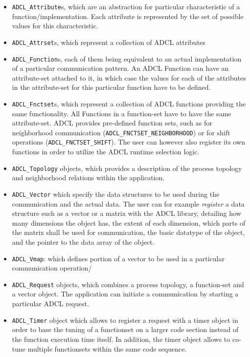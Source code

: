 \begin{itemize}

\item {\tt ADCL\_Attribute}s, which are an abstraction for particular
  characteristic of a function/implementation. Each attribute is represented
  by the set of possible values for this characteristic.

\item {\tt ADCL\_Attrset}s, which represent a collection of ADCL attributes

\item {\tt ADCL\_Function}s, each of them being equivalent to an actual
  implementation of a particular communication pattern. An ADCL Function can
  have an attribute-set attached to it, in which case the values for each of
  the attributes in the attribute-set for this particular function have to be
  defined.

\item {\tt ADCL\_Fnctset}s, which represent a collection of ADCL functions
  providing the same functionality. All Functions in a function-set have to
  have the same attribute-set. ADCL provides pre-defined function sets, such
  as for neighborhood communication ({\tt ADCL\_FNCTSET\_NEIGHBORHOOD}) or for
  shift operations ({\tt ADCL\_FNCTSET\_SHIFT}). The user can however also
  register its own functions in order to utilize the ADCL runtime selection
  logic.

\item {\tt ADCL\_Topology} objects, which provides a description of the
  process topology and neighborhood relations within the application.


\item {\tt ADCL\_Vector} which specify the data structures to be used during
  the communication and the actual data. The user can for example {\it
    register} a data structure such as a vector or a matrix with the ADCL
  library, detailing how many dimensions the object has, the extent of each
  dimension, which parts of the matrix shall be used for communication, the
  basic datatype of the object, and the pointer to the data array of the
  object.

\item {\tt ADCL\_Vmap}: which defines portion of a vector to be used in a
  particular communication operation/


\item {\tt ADCL\_Request} objects, which combines a process topology, a
  function-set and a vector object. The application can initiate a
  communication by starting a particular ADCL request.

\item{\tt ADCL\_Timer} object which allows to register a request with a timer
  object in order to base the tuning of a functionset on a larger code section
  instead of the function execution time itself. In addition, the timer object
  allows to co-tune multiple functionsets within the same code sequence.

\end{itemize}

